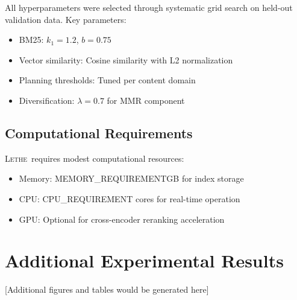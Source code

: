 \documentclass[letterpaper]{article}
\newcommand{\lethe}{\textsc{Lethe}}
\begin{document}
All hyperparameters were selected through systematic grid search on held-out validation data. Key parameters:

\begin{itemize}
    \item BM25: $k_1 = 1.2$, $b = 0.75$
    \item Vector similarity: Cosine similarity with L2 normalization
    \item Planning thresholds: Tuned per content domain
    \item Diversification: $\lambda = 0.7$ for MMR component
\end{itemize}

\subsection{Computational Requirements}

\lethe\ requires modest computational resources:
\begin{itemize}
    \item Memory: {{MEMORY_REQUIREMENT}}GB for index storage
    \item CPU: {{CPU_REQUIREMENT}} cores for real-time operation  
    \item GPU: Optional for cross-encoder reranking acceleration
\end{itemize}

\section{Additional Experimental Results}

[Additional figures and tables would be generated here]
\end{document}
